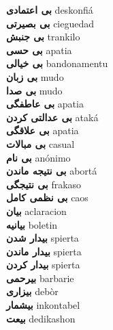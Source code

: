 \textbf{ بی اعتمادی  } deskonfiá \\
\textbf{ بی بصیرتی  } cieguedad \\
\textbf{ بی جنبش  } trankilo \\
\textbf{ بی حسی  } apatia \\
\textbf{ بی خیالی  } bandonamentu \\
\textbf{ بی زبان  } mudo \\
\textbf{ بی صدا  } mudo \\
\textbf{ بی عاطفگی  } apatia \\
\textbf{ بی عدالتی کردن  } ataká \\
\textbf{ بی علاقگی  } apatia \\
\textbf{ بی مبالات  } casual \\
\textbf{ بی نام  } anónimo \\
\textbf{ بی نتیجه ماندن  } abortá \\
\textbf{ بی نتیجگی  } frakaso \\
\textbf{ بی نظمی کامل  } caos \\
\textbf{ بیان  } aclaracion \\
\textbf{ بیانیه  } boletin \\
\textbf{ بیدار شدن  } spierta \\
\textbf{ بیدار ماندن  } spierta \\
\textbf{ بیدار کردن  } spierta \\
\textbf{ بیرحمی  } barbarie \\
\textbf{ بیزاری  } debòr \\
\textbf{ بیشمار  } inkontabel \\
\textbf{ بیعت  } dedikashon \\
